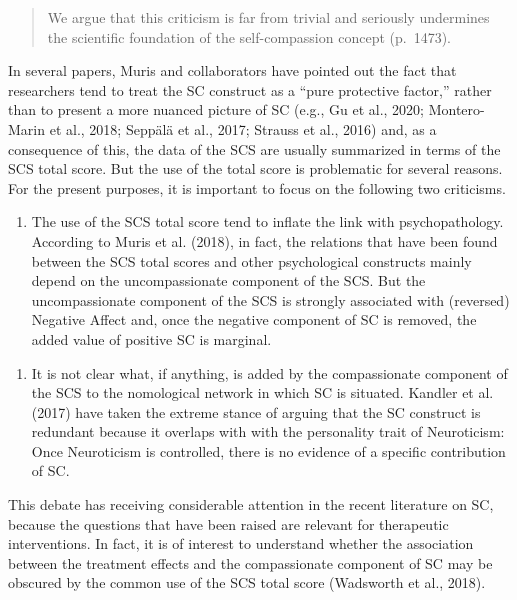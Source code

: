 \documentclass[
  english,
  man,floatsintext]{apa7}
\providecommand{\tightlist}{%
  \setlength{\itemsep}{0pt}\setlength{\parskip}{0pt}}
\begin{document}
\begin{quote}
We argue that this criticism is far from trivial and seriously undermines the scientific foundation of the self-compassion concept (p.~1473).
\end{quote}

In several papers, Muris and collaborators have pointed out the fact that researchers tend to treat the SC construct as a ``pure protective factor,'' rather than to present a more nuanced picture of SC (e.g., Gu et al., 2020; Montero-Marin et al., 2018; Seppälä et al., 2017; Strauss et al., 2016) and, as a consequence of this, the data of the SCS are usually summarized in terms of the SCS total score.
But the use of the total score is problematic for several reasons.
For the present purposes, it is important to focus on the following two criticisms.

\begin{enumerate}
\def\labelenumi{\arabic{enumi}.}
\tightlist
\item
  The use of the SCS total score tend to inflate the link with psychopathology. According to Muris et al. (2018), in fact, the relations that have been found between the SCS total scores and other psychological constructs mainly depend on the uncompassionate component of the SCS. But the uncompassionate component of the SCS is strongly associated with (reversed) Negative Affect and, once the negative component of SC is removed, the added value of positive SC is marginal.
\end{enumerate}

\begin{enumerate}
\def\labelenumi{\arabic{enumi}.}
\setcounter{enumi}{1}
\tightlist
\item
  It is not clear what, if anything, is added by the compassionate component of the SCS to the nomological network in which SC is situated. Kandler et al. (2017) have taken the extreme stance of arguing that the SC construct is redundant because it overlaps with with the personality trait of Neuroticism: Once Neuroticism is controlled, there is no evidence of a specific contribution of SC.
\end{enumerate}

This debate has receiving considerable attention in the recent literature on SC, because the questions that have been raised are relevant for therapeutic interventions.
In fact, it is of interest to understand whether the association between the treatment effects and the compassionate component of SC may be obscured by the common use of the SCS total score (Wadsworth et al., 2018).
\end{document}
